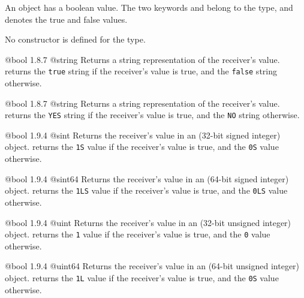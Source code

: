 
An  object has a boolean value. The two keywords  and  belong to the  type, and denotes the true and false values.

No constructor is defined for the  type.

{@bool}
{1.8.7}
{@string}
{Returns a string representation of the receiver's value.}
{returns the \texttt{\textquotedbl true\textquotedbl} string if the receiver's value is true, and the \texttt{\textquotedbl false\textquotedbl} string otherwise.}







{@bool}
{1.8.7}
{@string}
{Returns a string representation of the receiver's value.}
{returns the \texttt{\textquotedbl YES\textquotedbl} string if the receiver's value is true, and the \texttt{\textquotedbl NO\textquotedbl} string otherwise.}




{@bool}
{1.9.4}
{@sint}
{Returns the receiver's value in an  (32-bit signed integer) object.}
{returns the \texttt{1S}  value if the receiver's value is true, and the \texttt{0S}  value otherwise.}




{@bool}
{1.9.4}
{@sint64}
{Returns the receiver's value in an  (64-bit signed integer) object.}
{returns the \texttt{1LS}  value if the receiver's value is true, and the \texttt{0LS}  value otherwise.}




{@bool}
{1.9.4}
{@uint}
{Returns the receiver's value in an  (32-bit unsigned integer) object.}
{returns the \texttt{1}  value if the receiver's value is true, and the \texttt{0}  value otherwise.}




{@bool}
{1.9.4}
{@uint64}
{Returns the receiver's value in an  (64-bit unsigned integer) object.}
{returns the \texttt{1L}  value if the receiver's value is true, and the \texttt{0S}  value otherwise.}




